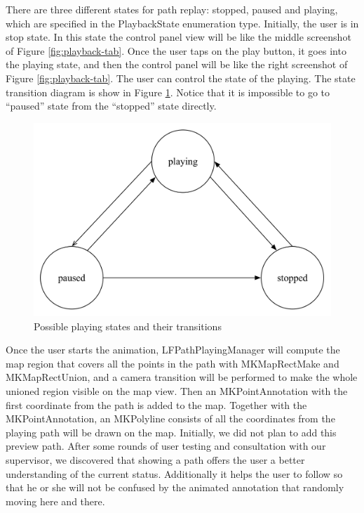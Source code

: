 \documentclass[12pt,a4paper]{article}
\renewcommand\texttt[1]{{\ttfamily\color{textttColor}#1}}
\begin{document}
                There are three different states for path replay: stopped, paused and playing, which are specified in the \texttt{PlaybackState} enumeration type. Initially, the user is in stop state. In this state the control panel view will be like the middle screenshot of Figure \ref{fig:playback-tab}. Once the user taps on the play button, it goes into the playing state, and then the control panel will be like the right screenshot of Figure \ref{fig:playback-tab}. The user can control the state of the playing. The state transition diagram is show in Figure \ref{fig:playback-state}. Notice that it is impossible to go to ``paused'' state from the ``stopped'' state directly.
                
                \begin{figure}
                    \includegraphics[width=.8\textwidth]{4-1-6-g-real}
                    \centering
                    \caption{Possible playing states and their transitions}
                    \label{fig:playback-state}
                \end{figure}
                
                Once the user starts the animation, \texttt{LFPathPlayingManager} will compute the map region that covers all the points in the path with \texttt{MKMapRectMake} and \texttt{MKMapRectUnion}, and a camera transition will be performed to make the whole unioned region visible on the map view. Then an \texttt{MKPointAnnotation} with the first coordinate from the path is added to the map. Together with the \texttt{MKPointAnnotation}, an \texttt{MKPolyline} consists of all the coordinates from the playing path will be drawn on the map. Initially, we did not plan to add this preview path. After some rounds of user testing and consultation with our supervisor, we discovered that showing a path offers the user a better understanding of the current status. Additionally it helps the user to follow so that he or she will not be confused by the animated annotation that randomly moving here and there.
                
\end{document}

